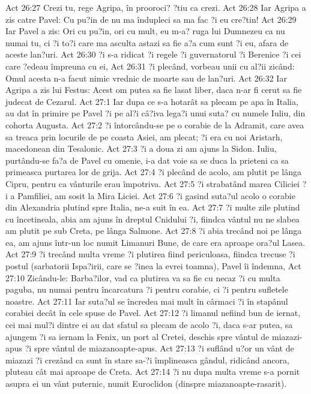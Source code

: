 Act 26:27  Crezi tu, rege Agripa, în prooroci? ?tiu ca crezi.
Act 26:28  Iar Agripa a zis catre Pavel: Cu pu?in de nu ma îndupleci sa ma fac ?i eu cre?tin!
Act 26:29  Iar Pavel a zis: Ori cu pu?in, ori cu mult, eu m-a? ruga lui Dumnezeu ca nu numai tu, ci ?i to?i care ma asculta astazi sa fie a?a cum sunt ?i eu, afara de aceste lan?uri.
Act 26:30  ?i s-a ridicat ?i regele ?i guvernatorul ?i Berenice ?i cei care ?edeau împreuna cu ei,
Act 26:31  ?i plecând, vorbeau unii cu al?ii zicând: Omul acesta n-a facut nimic vrednic de moarte sau de lan?uri.
Act 26:32  Iar Agripa a zis lui Festus: Acest om putea sa fie lasat liber, daca n-ar fi cerut sa fie judecat de Cezarul.
Act 27:1  Iar dupa ce s-a hotarât sa plecam pe apa în Italia, au dat în primire pe Pavel ?i pe al?i câ?iva lega?i unui suta? cu numele Iuliu, din cohorta Augusta.
Act 27:2  ?i întorcându-se pe o corabie de la Adramit, care avea sa treaca prin locurile de pe coasta Asiei, am plecat; ?i era cu noi Aristarh, macedonean din Tesalonic.
Act 27:3  ?i a doua zi am ajuns la Sidon. Iuliu, purtându-se fa?a de Pavel cu omenie, i-a dat voie sa se duca la prieteni ca sa primeasca purtarea lor de grija.
Act 27:4  ?i plecând de acolo, am plutit pe lânga Cipru, pentru ca vânturile erau împotriva.
Act 27:5  ?i strabatând marea Ciliciei ?i a Pamfiliei, am sosit la Mira Liciei.
Act 27:6  ?i gasind suta?ul acolo o corabie din Alexandria plutind spre Italia, ne-a suit în ea.
Act 27:7  ?i multe zile plutind cu încetineala, abia am ajuns în dreptul Cnidului ?i, fiindca vântul nu ne slabea am plutit pe sub Creta, pe lânga Salmone.
Act 27:8  ?i abia trecând noi pe lânga ea, am ajuns într-un loc numit Limanuri Bune, de care era aproape ora?ul Lasea.
Act 27:9  ?i trecând multa vreme ?i plutirea fiind periculoasa, fiindca trecuse ?i postul (sarbatorii Ispa?irii, care se ?inea la evrei toamna), Pavel îi îndemna,
Act 27:10  Zicându-le: Barba?ilor, vad ca plutirea va sa fie cu necaz ?i cu multa paguba, nu numai pentru încarcatura ?i pentru corabie, ci ?i pentru sufletele noastre.
Act 27:11  Iar suta?ul se încredea mai mult în cârmaci ?i în stapânul corabiei decât în cele spuse de Pavel.
Act 27:12  ?i limanul nefiind bun de iernat, cei mai mul?i dintre ei au dat sfatul sa plecam de acolo ?i, daca s-ar putea, sa ajungem ?i sa iernam la Fenix, un port al Cretei, deschis spre vântul de miazazi-apus ?i spre vântul de miazanoapte-apus.
Act 27:13  ?i suflând u?or un vânt de miazazi ?i crezând ca sunt în stare sa-?i împlineasca gândul, ridicând ancora, pluteau cât mai aproape de Creta.
Act 27:14  ?i nu dupa multa vreme s-a pornit asupra ei un vânt puternic, numit Euroclidon (dinspre miazanoapte-rasarit).
